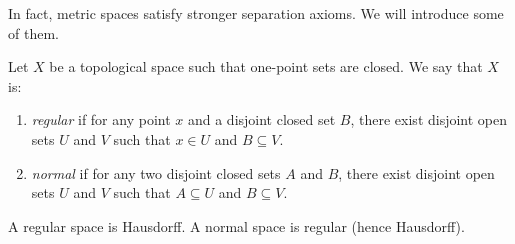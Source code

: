 

In fact, metric spaces satisfy stronger separation axioms. We will introduce some of them.

\begin{definition}
    Let $X$ be a topological space such that one-point sets are closed. We say that $X$ is:
    \begin{enumerate}
        \item \emph{regular} if for any point $x$ and a disjoint closed set $B$, there exist disjoint open sets $U$ and $V$ such that $x\in U$ and $B\subseteq V$.
        \item \emph{normal} if for any two disjoint closed sets $A$ and $B$, there exist disjoint open sets $U$ and $V$ such that $A\subseteq U$ and $B\subseteq V$.
    \end{enumerate}
\end{definition}


\begin{remark}
    A regular space is Hausdorff. A normal space is regular (hence Hausdorff).
\end{remark}







